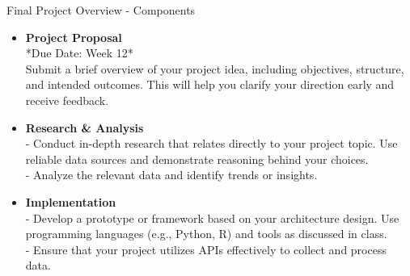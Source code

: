\documentclass[aspectratio=169]{beamer}
\begin{document}
\begin{frame}[fragile]{Final Project Overview - Components}
    \begin{itemize}
        \item \textbf{Project Proposal} \\
            *Due Date: Week 12* \\ 
            Submit a brief overview of your project idea, including objectives, structure, and intended outcomes. This will help you clarify your direction early and receive feedback.

        \item \textbf{Research \& Analysis} \\
            - Conduct in-depth research that relates directly to your project topic. Use reliable data sources and demonstrate reasoning behind your choices. \\
            - Analyze the relevant data and identify trends or insights.

        \item \textbf{Implementation} \\
            - Develop a prototype or framework based on your architecture design. Use programming languages (e.g., Python, R) and tools as discussed in class. \\
            - Ensure that your project utilizes APIs effectively to collect and process data.
    \end{itemize}
\end{frame}
\end{document}
